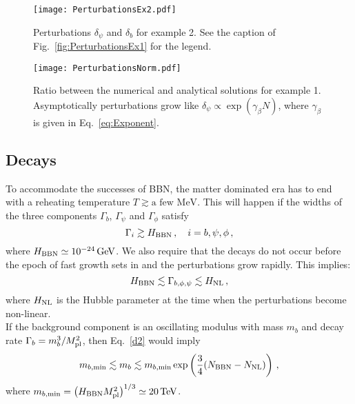 \documentclass[a4paper, amsfonts, amssymb, amsmath, reprint, showkeys, nofootinbib, twoside, superscriptaddress]{revtex4-1}
\def\mpl{M_{\rm pl}}
\def\mpl{M_{\rm pl}}
\begin{document}
%
\begin{figure}[h!]
  \texttt{[image: PerturbationsEx2.pdf]}
\caption{Perturbations $\delta_\psi$ and $\delta_b$ for example 2. See the caption of Fig.~\ref{fig:PerturbationsEx1} for the legend.}
\label{fig:PerturbationsEx2}
\end{figure}
\begin{figure}[h!]
  \texttt{[image: PerturbationsNorm.pdf]}
\caption{Ratio between the numerical and analytical solutions for example 1. Asymptotically perturbations grow like $\delta_\psi \propto \exp(\gamma_\beta N)$, where $\gamma_\beta$ is given in Eq.~\eqref{eq:Exponent}.}
\label{fig:PerturbationsNorm}
\end{figure}
%
\subsection{Decays}
\label{sec:Decay}

To accommodate the successes of BBN, the matter dominated era has to end with a reheating temperature $T \gtrsim \text{a few MeV}$. This will happen if the widths of the three components $\Gamma_b$, $\Gamma_\psi$ and $\Gamma_\phi$ satisfy
%
\begin{equation}
\label{d1}
\Gamma_i \gtrsim H_{\rm BBN} \,, \quad i = b, \psi, \phi \,,
\end{equation}
%
where $H_{\rm BBN} \simeq 10^{-24} \, \text{GeV}$. We also require that the decays do not occur before the epoch of fast growth sets in and the perturbations grow rapidly. This implies:
%
\begin{equation}
\label{d2}
H_{\rm BBN} \lesssim \Gamma_{b, \phi, \psi} \lesssim H_{\rm NL} \,,
\end{equation}
%
where $H_{\rm NL}$ is the Hubble parameter at the time when the perturbations become non-linear.\\

If the background component is an oscillating modulus with mass $m_b$ and decay rate $\Gamma_b = m_b^3/\mpl^2$, then Eq.~\eqref{d2} would imply
\begin{equation}
m_{b, \rm min} \lesssim m_b \lesssim m_{b, \rm min} \exp\left(\frac{3}{4} (N_{\rm BBN} - N_{\rm NL})\right) \,,
\end{equation}
where $m_{b, \rm min} = \left(H_{\rm BBN} \mpl^2\right)^{1/3} \simeq 20 \, \text{TeV}$.
\end{document}
